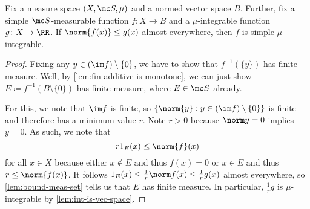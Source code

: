 \documentclass[../notes.tex]{subfiles}
\begin{document}
\begin{corollary} \label{cor:bounded-simp-meas-is-simp-int}
	Fix a measure space $(X,\mc S,\mu)$ and a normed vector space $B$. Further, fix a simple $\mc S$-measurable function $f\colon X\to B$ and a $\mu$-integrable function $g\colon X\to\RR$. If $\norm{f(x)}\le g(x)$ almost everywhere, then $f$ is simple $\mu$-integrable.
\end{corollary}
\begin{proof}
	Fixing any $y\in(\im f)\setminus\{0\}$, we have to show that $f^{-1}(\{y\})$ has finite measure. Well, by \autoref{lem:fin-additive-is-monotone}, we can just show $E\coloneqq f^{-1}(B\setminus\{0\})$ has finite measure, where $E\in\mc S$ already.

	For this, we note that $\im f$ is finite, so $\{\norm{y}:y\in(\im f)\setminus\{0\}\}$ is finite and therefore has a minimum value $r$. Note $r>0$ because $\norm y=0$ implies $y=0$. As such, we note that
	\[r1_E(x)\le\norm{f}(x)\]
	for all $x\in X$ because either $x\notin E$ and thus $f(x)=0$ or $x\in E$ and thus $r\le\norm{f(x)}$. It follows $1_E(x)\le\frac1r\norm f(x)\le\frac1rg(x)$ almost everywhere, so \autoref{lem:bound-meas-set} tells us that $E$ has finite measure. In particular, $\frac 1rg$ is $\mu$-integrable by \autoref{lem:int-is-vec-space}. 
\end{proof}
\end{document}
